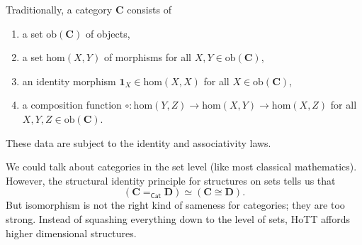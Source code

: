 \documentclass{amsart}
\theoremstyle{definition}
\newcommand{\Cat}{\ensuremath{\mathsf{Cat}}}
\newcommand{\ob}[1]{\ensuremath{\mathrm{ob}{(\cat{#1})}}}
\newcommand{\cHom}[2]{\ensuremath{\mathrm{hom}(#1,#2)}}
\newcommand{\cId}{\ensuremath{\mathbf{1}}}
\newcommand{\cat}[1]{\ensuremath{\mathbf{#1}}}
\begin{document}
Traditionally, a category $\cat{C}$ consists of
\begin{enumerate}
    \item a set $\ob{C}$ of objects,
    \item a set $\cHom{X}{Y}$ of morphisms for all $X, Y \in \ob{C}$,
    \item an identity morphism $\cId_{X} \in \cHom{X}{X}$ for all $X \in \ob{C}$,
    \item a composition function $\circ : \cHom{Y}{Z} \to \cHom{X}{Y} \to \cHom{X}{Z}$ for all $X, Y, Z \in \ob{C}$.
\end{enumerate}
These data are subject to the identity and associativity laws.

We could talk about categories in the set level (like most classical mathematics).
However, the structural identity principle for structures on sets tells us that 
\[(\cat{C} =_{\Cat} \cat{D}) \simeq (\cat{C} \cong \cat{D}).\]
But isomorphism is not the right kind of sameness for categories; they are too strong.
Instead of squashing everything down to the level of sets, HoTT affords higher dimensional structures.
\end{document}
